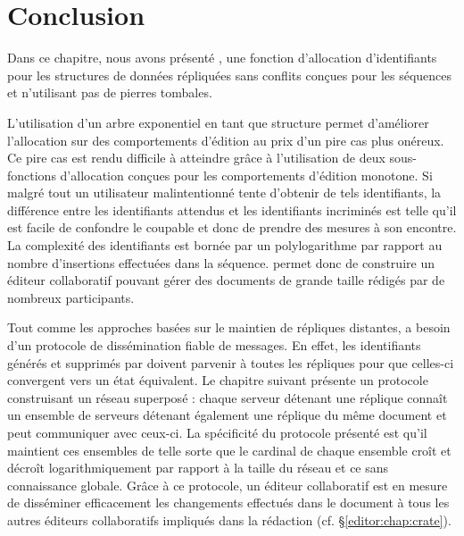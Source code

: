 
\section{Conclusion}
\label{repl:sec:conclusion}

Dans ce chapitre, nous avons présenté \LSEQ, une fonction d'allocation
d'identifiants pour les structures de données répliquées sans conflits conçues
pour les séquences et n'utilisant pas de pierres tombales.

L'utilisation d'un arbre exponentiel en tant que structure permet d'améliorer
l'allocation sur des comportements d'édition au prix d'un pire cas plus
onéreux. Ce pire cas est rendu difficile à atteindre grâce à l'utilisation de
deux sous-fonctions d'allocation conçues pour les comportements d'édition
monotone. Si malgré tout un utilisateur malintentionné tente d'obtenir de tels
identifiants, la différence entre les identifiants attendus et les identifiants
incriminés est telle qu'il est facile de confondre le coupable et donc de
prendre des mesures à son encontre. La complexité des identifiants \LSEQ est
bornée par un polylogarithme par rapport au nombre d'insertions effectuées
dans la séquence. \LSEQ permet donc de construire un éditeur collaboratif pouvant
gérer des documents de grande taille rédigés par de nombreux participants.

Tout comme les approches basées sur le maintien de répliques distantes, \LSEQ a
besoin d'un protocole de dissémination fiable de messages. En effet, les
identifiants générés et supprimés par \LSEQ doivent parvenir à toutes les
répliques pour que celles-ci convergent vers un état équivalent.  Le chapitre
suivant présente un protocole construisant un réseau superposé : chaque serveur
détenant une réplique connaît un ensemble de serveurs détenant également une
réplique du même document et peut communiquer avec ceux-ci. La spécificité du
protocole présenté est qu'il maintient ces ensembles de telle sorte que le
cardinal de chaque ensemble croît et décroît logarithmiquement par rapport à la
taille du réseau et ce sans connaissance globale. Grâce à ce protocole, un
éditeur collaboratif est en mesure de disséminer efficacement les changements
effectués dans le document à tous les autres éditeurs collaboratifs impliqués
dans la rédaction (cf. §\ref{editor:chap:crate}).


